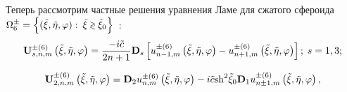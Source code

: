 %
%
%
%
%

Теперь рассмотрим частные решения уравнения Ламе для сжатого сфероида $\Omega _6^ \pm = \Big\{ {(\tilde \xi ,\tilde \eta ,\varphi ):{\mkern 1mu} {\mkern 1mu} {\kern 1pt} \tilde \xi  \mathbin{\lower.3ex\hbox{$\buildrel>\over
{\smash{\scriptstyle<}\vphantom{_x}}$}} {{\tilde \xi }_0}} \Big\}$~\cite{Nikolaev1993}:
\begin{equation}\label{eq:1:71}
{\bf{U}}_{s,n,m}^{ \pm (6)}\left( {\tilde \xi ,\tilde \eta ,\varphi } \right) = \frac{{ - i\tilde c}}{{2n + 1}}{{\bf{D}}_s}\left[ {u_{n - 1,m}^{ \pm (6)}\left( {\tilde \xi ,\tilde \eta ,\varphi } \right) - u_{n + 1,m}^{ \pm (6)}\left( {\tilde \xi ,\tilde \eta ,\varphi } \right)} \right];\,{\kern 1pt} s = 1,3;
\end{equation}

\begin{equation}\label{eq:1:72}
{\bf{U}}_{2,n,m}^{ \pm (6)}\left( {\tilde \xi ,\tilde \eta ,\varphi } \right) = {{\bf{D}}_2}u_{n,m}^{ \pm (6)}\left( {\tilde \xi ,\tilde \eta ,\varphi } \right) - i\tilde c{{\mathop{\rm sh}\nolimits} ^2}{\tilde \xi _0}{{\bf{D}}_1}u_{n \pm 1,m}^{ \pm (6)}\left( {\tilde \xi ,\tilde \eta ,\varphi } \right),
\end{equation}

